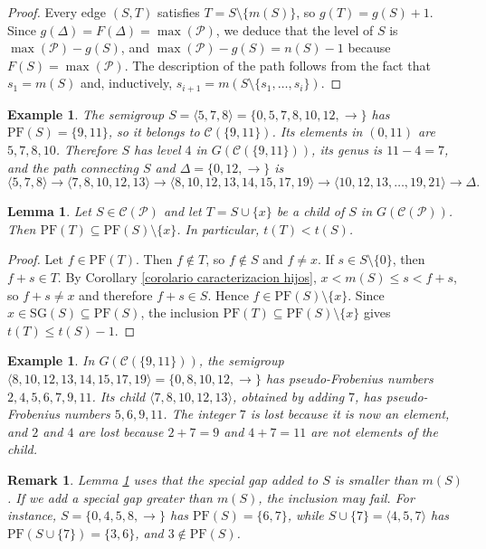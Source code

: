 \documentclass[11pt]{article}
\newtheorem{lemma}[theorem]{Lemma}
\newtheorem{remark}[theorem]{Remark}
\newtheorem{example}[theorem]{Example}
\numberwithin{equation}{section}
\newcommand{\CP}{\mathcal C(\mathcal P)}
\newcommand{\PF}{\mathrm{PF}}
\newcommand{\SG}{\mathrm{SG}}
\begin{document}
\begin{proof}
Every edge $(S,T)$ satisfies $T=S\setminus\{m(S)\}$, so $g(T)=g(S)+1$. Since $g(\Delta)=F(\Delta)=\max(\mathcal P)$, we deduce that the level of $S$ is $\max(\mathcal P)-g(S)$, and $\max(\mathcal P)-g(S)=n(S)-1$ because $F(S)=\max(\mathcal P)$. The description of the path follows from the fact that $s_1=m(S)$ and, inductively, $s_{i+1}=m(S\setminus\{s_1,\dots,s_i\})$.
\end{proof}

\begin{example}\label{ejemplo nivel}
The semigroup $S=\langle 5,7,8\rangle=\{0,5,7,8,10,12,\rightarrow\}$ has $\PF(S)=\{9,11\}$, so it belongs to $\mathcal C(\{9,11\})$. Its elements in $(0,11)$ are $5,7,8,10$. Therefore $S$ has level $4$ in $G(\mathcal C(\{9,11\}))$, its genus is $11-4=7$, and the path connecting $S$ and $\Delta=\{0,12,\rightarrow\}$ is
\[
\langle 5,7,8\rangle\to\langle 7,8,10,12,13\rangle\to\langle 8,10,12,13,14,15,17,19\rangle\to\langle 10,12,13,\ldots,19,21\rangle\to\Delta .
\]
\end{example}

\begin{lemma}\label{lema PF decrece}
Let $S\in\CP$ and let $T=S\cup\{x\}$ be a child of $S$ in $G(\CP)$. Then $\PF(T)\subseteq\PF(S)\setminus\{x\}$. In particular, $t(T)<t(S)$.
\end{lemma}

\begin{proof}
Let $f\in\PF(T)$. Then $f\notin T$, so $f\notin S$ and $f\ne x$. If $s\in S\setminus\{0\}$, then $f+s\in T$. By Corollary \ref{corolario caracterizacion hijos}, $x<m(S)\leq s<f+s$, so $f+s\neq x$ and therefore $f+s\in S$. Hence $f\in\PF(S)\setminus\{x\}$. Since $x\in\SG(S)\subseteq \PF(S)$, the inclusion $\PF(T)\subseteq\PF(S)\setminus\{x\}$ gives $t(T)\leq t(S)-1$.
\end{proof}

\begin{example}\label{ejemplo PF arista}
In $G(\mathcal C(\{9,11\}))$, the semigroup $\langle 8,10,12,13,14,15,17,19\rangle=\{0,8,10,12,\rightarrow\}$ has pseudo-Frobenius numbers $2,4,5,6,7,9,11$. Its child $\langle 7,8,10,12,13\rangle$, obtained by adding $7$, has pseudo-Frobenius numbers $5,6,9,11$. The integer $7$ is lost because it is now an element, and $2$ and $4$ are lost because $2+7=9$ and $4+7=11$ are not elements of the child.
\end{example}

\begin{remark}\label{nota hipotesis}
Lemma \ref{lema PF decrece} uses that the special gap added to $S$ is smaller than $m(S)$. If we add a special gap greater than $m(S)$, the inclusion may fail. For instance, $S=\{0,4,5,8,\rightarrow\}$ has $\PF(S)=\{6,7\}$, while $S\cup\{7\}=\langle 4,5,7\rangle$ has $\PF(S\cup\{7\})=\{3,6\}$, and $3\notin\PF(S)$.
\end{remark}
\end{document}
